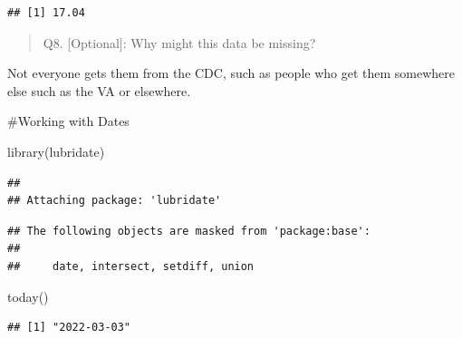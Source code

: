 \documentclass[
]{article}
\newenvironment{Shaded}{\begin{snugshade}}{\end{snugshade}}
\newcommand{\CommentTok}[1]{\textcolor[rgb]{0.56,0.35,0.01}{\textit{#1}}}
\newcommand{\DecValTok}[1]{\textcolor[rgb]{0.00,0.00,0.81}{#1}}
\newcommand{\FunctionTok}[1]{\textcolor[rgb]{0.00,0.00,0.00}{#1}}
\newcommand{\NormalTok}[1]{#1}
\newcommand{\OtherTok}[1]{\textcolor[rgb]{0.56,0.35,0.01}{#1}}
\newcommand{\SpecialCharTok}[1]{\textcolor[rgb]{0.00,0.00,0.00}{#1}}
\begin{document}
\begin{verbatim}
## [1] 17.04
\end{verbatim}

\begin{quote}
Q8. {[}Optional{]}: Why might this data be missing?
\end{quote}

Not everyone gets them from the CDC, such as people who get them
somewhere else such as the VA or elsewhere.

\#Working with Dates

\begin{Shaded}
\begin{Highlighting}[]
\FunctionTok{library}\NormalTok{(lubridate)}
\end{Highlighting}
\end{Shaded}

\begin{verbatim}
## 
## Attaching package: 'lubridate'
\end{verbatim}

\begin{verbatim}
## The following objects are masked from 'package:base':
## 
##     date, intersect, setdiff, union
\end{verbatim}

\begin{Shaded}
\begin{Highlighting}[]
\FunctionTok{today}\NormalTok{()}
\end{Highlighting}
\end{Shaded}

\begin{verbatim}
## [1] "2022-03-03"
\end{verbatim}

\begin{Shaded}
\end{Shaded}

\begin{Shaded}
\end{Shaded}
\end{document}
